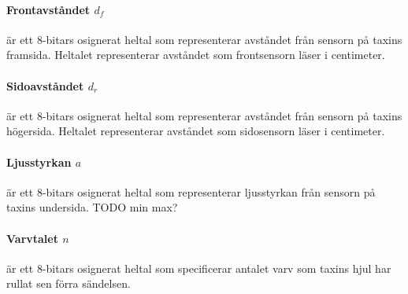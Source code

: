 \documentclass[designspec/spec.tex]{subfiles}
\begin{document}
\paragraph{Frontavståndet $d_f$} är ett 8-bitars osignerat heltal som
representerar avståndet från sensorn på taxins framsida. Heltalet representerar
avståndet som frontsensorn läser i centimeter.

\paragraph{Sidoavståndet $d_r$} är ett 8-bitars osignerat heltal som
representerar avståndet från sensorn på taxins högersida. Heltalet
representerar avståndet som sidosensorn läser i centimeter.

\paragraph{Ljusstyrkan $a$} är ett 8-bitars osignerat heltal som representerar
ljusstyrkan från sensorn på taxins undersida. TODO min max?

\paragraph{Varvtalet $n$} är ett 8-bitars osignerat heltal som specificerar
antalet varv som taxins hjul har rullat sen förra sändelsen.
\end{document}
